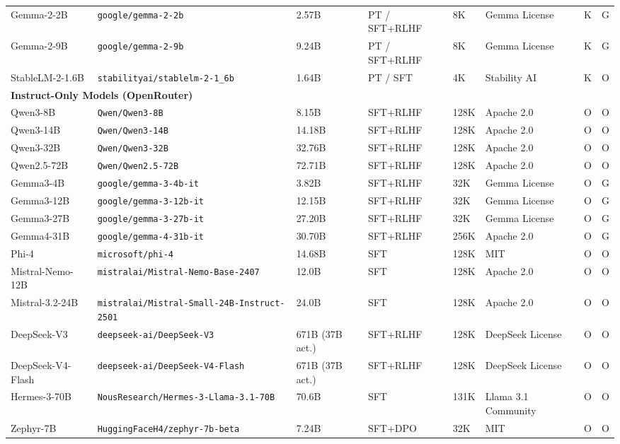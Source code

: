 \begin{table}[h]
\begin{tabular}{llllllll}
Gemma-2-2B & \texttt{google/gemma-2-2b} & 2.57B & PT / SFT+RLHF & 8K & Gemma License & K & G \\
Gemma-2-9B & \texttt{google/gemma-2-9b} & 9.24B & PT / SFT+RLHF & 8K & Gemma License & K & G \\
StableLM-2-1.6B & \texttt{stabilityai/stablelm-2-1\_6b} & 1.64B & PT / SFT & 4K & Stability AI & K & O \\
\midrule
\multicolumn{8}{l}{\textbf{Instruct-Only Models (OpenRouter)}} \\
\midrule
Qwen3-8B & \texttt{Qwen/Qwen3-8B} & 8.15B & SFT+RLHF & 128K & Apache 2.0 & O & O \\
Qwen3-14B & \texttt{Qwen/Qwen3-14B} & 14.18B & SFT+RLHF & 128K & Apache 2.0 & O & O \\
Qwen3-32B & \texttt{Qwen/Qwen3-32B} & 32.76B & SFT+RLHF & 128K & Apache 2.0 & O & O \\
Qwen2.5-72B & \texttt{Qwen/Qwen2.5-72B} & 72.71B & SFT+RLHF & 128K & Apache 2.0 & O & O \\
Gemma3-4B & \texttt{google/gemma-3-4b-it} & 3.82B & SFT+RLHF & 32K & Gemma License & O & G \\
Gemma3-12B & \texttt{google/gemma-3-12b-it} & 12.15B & SFT+RLHF & 32K & Gemma License & O & G \\
Gemma3-27B & \texttt{google/gemma-3-27b-it} & 27.20B & SFT+RLHF & 32K & Gemma License & O & G \\
Gemma4-31B & \texttt{google/gemma-4-31b-it} & 30.70B & SFT+RLHF & 256K & Apache 2.0 & O & G \\
Phi-4 & \texttt{microsoft/phi-4} & 14.68B & SFT & 128K & MIT & O & O \\
Mistral-Nemo-12B & \texttt{mistralai/Mistral-Nemo-Base-2407} & 12.0B & SFT & 128K & Apache 2.0 & O & O \\
Mistral-3.2-24B & \texttt{mistralai/Mistral-Small-24B-Instruct-2501} & 24.0B & SFT & 128K & Apache 2.0 & O & O \\
DeepSeek-V3 & \texttt{deepseek-ai/DeepSeek-V3} & 671B (37B act.) & SFT+RLHF & 128K & DeepSeek License & O & O \\
DeepSeek-V4-Flash & \texttt{deepseek-ai/DeepSeek-V4-Flash} & 671B (37B act.) & SFT+RLHF & 128K & DeepSeek License & O & O \\
Hermes-3-70B & \texttt{NousResearch/Hermes-3-Llama-3.1-70B} & 70.6B & SFT & 131K & Llama 3.1 Community & O & O \\
Zephyr-7B & \texttt{HuggingFaceH4/zephyr-7b-beta} & 7.24B & SFT+DPO & 32K & MIT & O & O \\

\end{tabular}
\end{table}
